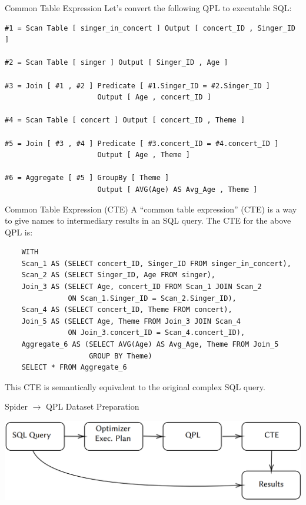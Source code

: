 \documentclass{beamer}
\begin{document}
\begin{frame}[fragile]{Common Table Expression}
    Let's convert the following QPL to executable SQL:

    \begin{verbatim}
#1 = Scan Table [ singer_in_concert ] Output [ concert_ID , Singer_ID ]
          
#2 = Scan Table [ singer ] Output [ Singer_ID , Age ]
          
#3 = Join [ #1 , #2 ] Predicate [ #1.Singer_ID = #2.Singer_ID ]
                      Output [ Age , concert_ID ]
                      
#4 = Scan Table [ concert ] Output [ concert_ID , Theme ]
          
#5 = Join [ #3 , #4 ] Predicate [ #3.concert_ID = #4.concert_ID ]
                      Output [ Age , Theme ]
                      
#6 = Aggregate [ #5 ] GroupBy [ Theme ]
                      Output [ AVG(Age) AS Avg_Age , Theme ]
    \end{verbatim}
\end{frame}

\begin{frame}[fragile]{Common Table Expression (CTE)}
    A ``common table expression'' (CTE) is a way to give names to intermediary results in an SQL query. The CTE for the above QPL is:

    \begin{verbatim}
    WITH
    Scan_1 AS (SELECT concert_ID, Singer_ID FROM singer_in_concert),
    Scan_2 AS (SELECT Singer_ID, Age FROM singer),
    Join_3 AS (SELECT Age, concert_ID FROM Scan_1 JOIN Scan_2
               ON Scan_1.Singer_ID = Scan_2.Singer_ID),
    Scan_4 AS (SELECT concert_ID, Theme FROM concert),
    Join_5 AS (SELECT Age, Theme FROM Join_3 JOIN Scan_4
               ON Join_3.concert_ID = Scan_4.concert_ID),
    Aggregate_6 AS (SELECT AVG(Age) AS Avg_Age, Theme FROM Join_5
                    GROUP BY Theme)
    SELECT * FROM Aggregate_6
    \end{verbatim}

    This CTE is \alert{semantically equivalent} to the original complex SQL query.
\end{frame}

\begin{frame}{Spider $\rightarrow$ QPL Dataset Preparation}
    \begin{center}
        \includegraphics[width=\textwidth]{qpl-creation.png}
    \end{center}
\end{frame}
\end{document}

